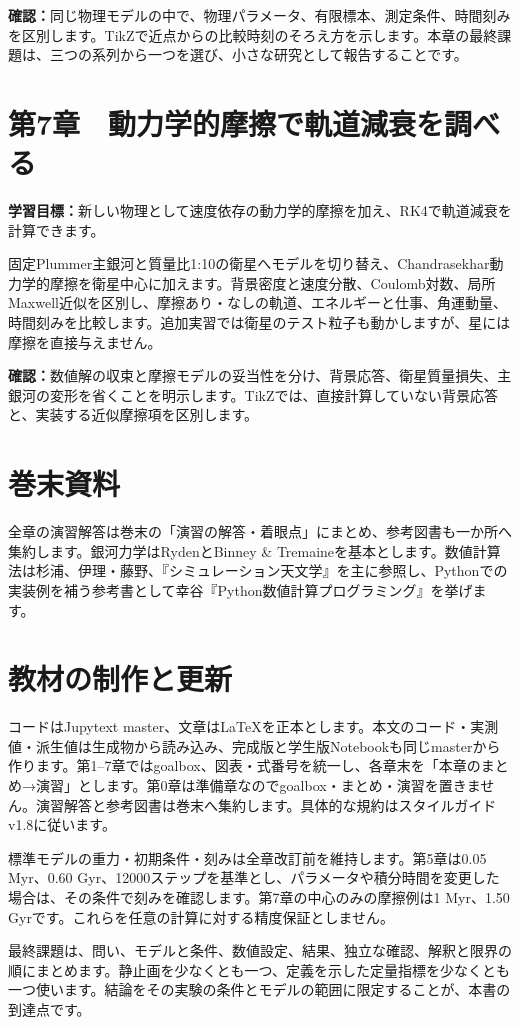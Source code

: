 \documentclass[10pt,openany]{book}
\begin{document}
\textbf{確認：}同じ物理モデルの中で、物理パラメータ、有限標本、測定条件、時間刻みを区別します。TikZで近点からの比較時刻のそろえ方を示します。本章の最終課題は、三つの系列から一つを選び、小さな研究として報告することです。

\section{第7章　動力学的摩擦で軌道減衰を調べる}
\textbf{学習目標：}新しい物理として速度依存の動力学的摩擦を加え、RK4で軌道減衰を計算できます。

固定Plummer主銀河と質量比1:10の衛星へモデルを切り替え、Chandrasekhar動力学的摩擦を衛星中心に加えます。背景密度と速度分散、Coulomb対数、局所Maxwell近似を区別し、摩擦あり・なしの軌道、エネルギーと仕事、角運動量、時間刻みを比較します。追加実習では衛星のテスト粒子も動かしますが、星には摩擦を直接与えません。

\textbf{確認：}数値解の収束と摩擦モデルの妥当性を分け、背景応答、衛星質量損失、主銀河の変形を省くことを明示します。TikZでは、直接計算していない背景応答と、実装する近似摩擦項を区別します。

\section{巻末資料}
全章の演習解答は巻末の「演習の解答・着眼点」にまとめ、参考図書も一か所へ集約します。銀河力学はRydenとBinney \& Tremaineを基本とします。数値計算法は杉浦、伊理・藤野、『シミュレーション天文学』を主に参照し、Pythonでの実装例を補う参考書として幸谷『Python数値計算プログラミング』を挙げます。

\section{教材の制作と更新}
コードはJupytext master、文章はLaTeXを正本とします。本文のコード・実測値・派生値は生成物から読み込み、完成版と学生版Notebookも同じmasterから作ります。第1--7章ではgoalbox、図表・式番号を統一し、各章末を「本章のまとめ→演習」とします。第0章は準備章なのでgoalbox・まとめ・演習を置きません。演習解答と参考図書は巻末へ集約します。具体的な規約はスタイルガイドv1.8に従います。

標準モデルの重力・初期条件・刻みは全章改訂前を維持します。第5章は0.05 Myr、0.60 Gyr、12000ステップを基準とし、パラメータや積分時間を変更した場合は、その条件で刻みを確認します。第7章の中心のみの摩擦例は1 Myr、1.50 Gyrです。これらを任意の計算に対する精度保証としません。

最終課題は、問い、モデルと条件、数値設定、結果、独立な確認、解釈と限界の順にまとめます。静止画を少なくとも一つ、定義を示した定量指標を少なくとも一つ使います。結論をその実験の条件とモデルの範囲に限定することが、本書の到達点です。
\end{document}
